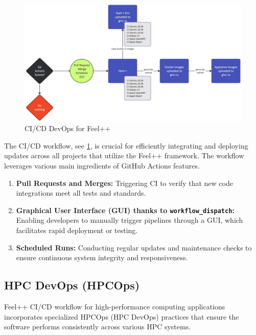 \documentclass[runningheads]{llncs}
\begin{document}
\begin{figure}
    \centering
    \includegraphics[width=\textwidth]{img-feelpp-devops.pdf}
    \caption{CI/CD DevOps for Feel++}
    \label{fig:feelpp-devops}
\end{figure}
The CI/CD workflow, see \cref{fig:feelpp-devops}, is crucial for efficiently integrating and deploying updates across all projects that utilize the Feel++ framework. 
The workflow leverages various main ingredients of GitHub Actions features.
\begin{enumerate}
    \item \textbf{Pull Requests and Merges:} Triggering CI to verify that new code integrations meet all tests and standards.
    \item \textbf{Graphical User Interface (GUI) thanks to \texttt{workflow\_dispatch}:} Enabling developers to manually trigger pipelines through a GUI, which facilitates rapid deployment or testing.
    \item \textbf{Scheduled Runs:} Conducting regular updates and maintenance checks to ensure continuous system integrity and responsiveness.
\end{enumerate}

\subsection{HPC DevOps (HPCOps)}
Feel++ CI/CD workflow for high-performance computing applications incorporates specialized HPCOps (HPC DevOps) practices that ensure the software performs consistently across various HPC systems.

\end{document}
